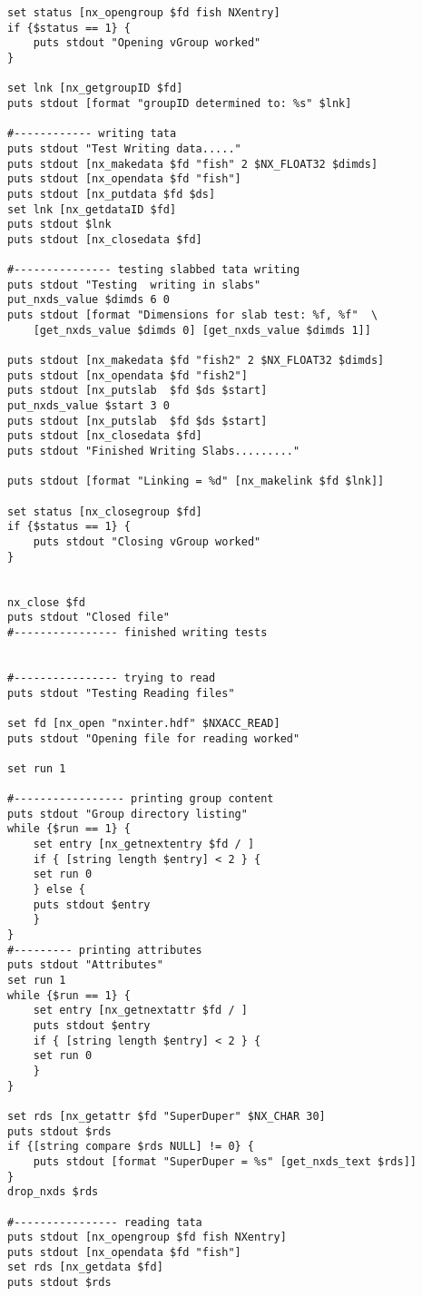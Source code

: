 \documentclass[12pt,a4paper]{article}
\begin{document}
\begin{verbatim}
set status [nx_opengroup $fd fish NXentry]
if {$status == 1} {
    puts stdout "Opening vGroup worked"
}

set lnk [nx_getgroupID $fd]
puts stdout [format "groupID determined to: %s" $lnk]

#------------ writing tata
puts stdout "Test Writing data....."
puts stdout [nx_makedata $fd "fish" 2 $NX_FLOAT32 $dimds]
puts stdout [nx_opendata $fd "fish"]
puts stdout [nx_putdata $fd $ds]
set lnk [nx_getdataID $fd]
puts stdout $lnk
puts stdout [nx_closedata $fd]

#--------------- testing slabbed tata writing
puts stdout "Testing  writing in slabs"
put_nxds_value $dimds 6 0
puts stdout [format "Dimensions for slab test: %f, %f"  \
	[get_nxds_value $dimds 0] [get_nxds_value $dimds 1]]
 
puts stdout [nx_makedata $fd "fish2" 2 $NX_FLOAT32 $dimds]
puts stdout [nx_opendata $fd "fish2"]
puts stdout [nx_putslab  $fd $ds $start]
put_nxds_value $start 3 0
puts stdout [nx_putslab  $fd $ds $start]
puts stdout [nx_closedata $fd]
puts stdout "Finished Writing Slabs........."

puts stdout [format "Linking = %d" [nx_makelink $fd $lnk]]

set status [nx_closegroup $fd]
if {$status == 1} {
    puts stdout "Closing vGroup worked"
}


nx_close $fd
puts stdout "Closed file"
#---------------- finished writing tests


#---------------- trying to read
puts stdout "Testing Reading files"

set fd [nx_open "nxinter.hdf" $NXACC_READ]
puts stdout "Opening file for reading worked"

set run 1

#----------------- printing group content
puts stdout "Group directory listing"
while {$run == 1} {
    set entry [nx_getnextentry $fd / ]
    if { [string length $entry] < 2 } {
	set run 0
    } else {
	puts stdout $entry
    }
}
#--------- printing attributes
puts stdout "Attributes"
set run 1
while {$run == 1} {
    set entry [nx_getnextattr $fd / ]
    puts stdout $entry
    if { [string length $entry] < 2 } {
	set run 0
    } 
}

set rds [nx_getattr $fd "SuperDuper" $NX_CHAR 30]
puts stdout $rds
if {[string compare $rds NULL] != 0} {
    puts stdout [format "SuperDuper = %s" [get_nxds_text $rds]]
}
drop_nxds $rds

#---------------- reading tata
puts stdout [nx_opengroup $fd fish NXentry]
puts stdout [nx_opendata $fd "fish"]
set rds [nx_getdata $fd]
puts stdout $rds


\end{verbatim}
\end{document}
